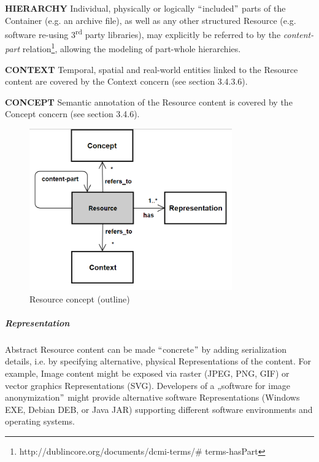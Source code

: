 


\textbf{HIERARCHY} Individual, physically or logically $``$included$"$  parts of the Container (e.g. an archive file), as well as any other structured Resource (e.g. software re-using 3\textsuperscript{rd} party libraries), may explicitly be referred to by the \textit{content-part} relation\footnote{http://dublincore.org/documents/dcmi-terms/$\#$ terms-hasPart }, allowing the modeling of part-whole hierarchies.

\textbf{CONTEXT} Temporal, spatial and real-world entities linked to the Resource content are covered by the Context concern (see section 3.4.3.6).

\textbf{CONCEPT} Semantic annotation of the Resource content is covered by the Concept concern (see section 3.4.6).




\begin{figure}[H]
	\begin{Center}
		\includegraphics[width=3.44in,height=2.74in]{./media/image35.png}
		\caption{Resource concept (outline)}
		\label{fig:Resource_concept_outline}
	\end{Center}
\end{figure}




\subparagraph*{Representation}
Abstract Resource content can be made $``$concrete$"$  by adding serialization details, i.e. by specifying alternative, physical Representations of the content. For example, Image content might be exposed via raster (JPEG, PNG, GIF) or vector graphics Representations (SVG). Developers of a „software for image anonymization$"$  might provide alternative software Representations (Windows EXE, Debian DEB, or Java JAR) supporting different software environments and operating systems. 

